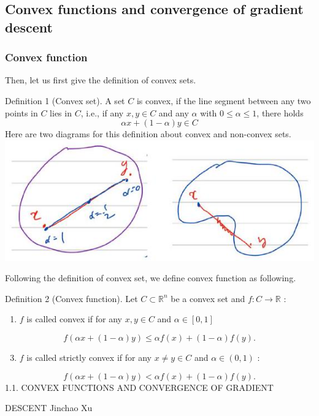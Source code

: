 \documentclass[10pt]{article}
\begin{document}
\subsection{Convex functions and convergence of gradient descent}
\subsubsection{Convex function}
Then, let us first give the definition of convex sets.

Definition 1 (Convex set). A set $C$ is convex, if the line segment between any two points in $C$ lies in $C$, i.e., if any $x, y \in C$ and any $\alpha$ with $0 \leq \alpha \leq 1$, there holds
$$
\alpha x+(1-\alpha) y \in C
$$
Here are two diagrams for this definition about convex and non-convex sets.\\

\includegraphics[max width=\textwidth]{2022_03_25_9faca01b68c57c6da639g-3}

Following the definition of convex set, we define convex function as following.

Definition 2 (Convex function). Let $C \subset \mathbb{R}^{n}$ be a convex set and $f: C \rightarrow \mathbb{R}$ :

\begin{enumerate}
  \item $f$ is called convex if for any $x, y \in C$ and $\alpha \in[0,1]$
\end{enumerate}
$$
f(\alpha x+(1-\alpha) y) \leq \alpha f(x)+(1-\alpha) f(y) .
$$

\begin{enumerate}
  \setcounter{enumi}{2}
  \item $f$ is called strictly convex if for any $x \neq y \in C$ and $\alpha \in(0,1)$ :
\end{enumerate}
$$
f(\alpha x+(1-\alpha) y)<\alpha f(x)+(1-\alpha) f(y) .
$$
1.1. CONVEX FUNCTIONS AND CONVERGENCE OF GRADIENT

DESCENT Jinchao Xu
\end{document}

